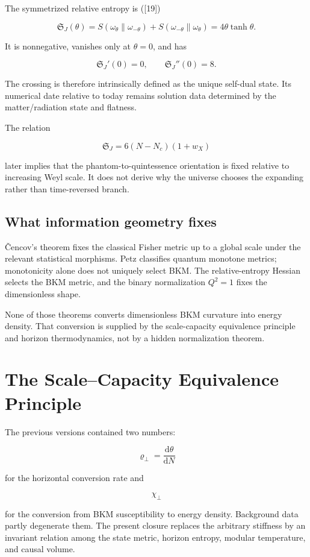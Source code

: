 \documentclass[
  11pt,
  letterpaper,
]{article}
\begin{document}
The symmetrized relative entropy is ({[}19{]})

\[
\boxed{
\mathfrak S_J(\theta)
=S(\omega_\theta\|\omega_{-\theta})
+S(\omega_{-\theta}\|\omega_\theta)
=4\theta\tanh\theta.
}
\]

It is nonnegative, vanishes only at \(\theta=0\), and has

\[
\mathfrak S_J'(0)=0,
\qquad
\mathfrak S_J''(0)=8.
\]

The crossing is therefore intrinsically defined as the unique self-dual
state. Its numerical date relative to today remains solution data
determined by the matter/radiation state and flatness.

The relation

\[
\mathfrak S_J=6(N-N_c)(1+w_X)
\]

later implies that the phantom-to-quintessence orientation is fixed
relative to increasing Weyl scale. It does not derive why the universe
chooses the expanding rather than time-reversed branch.

\subsection{What information geometry
fixes}\label{what-information-geometry-fixes}

Čencov's theorem fixes the classical Fisher metric up to a global scale
under the relevant statistical morphisms. Petz classifies quantum
monotone metrics; monotonicity alone does not uniquely select BKM. The
relative-entropy Hessian selects the BKM metric, and the binary
normalization \(Q^2=1\) fixes the dimensionless shape.

None of those theorems converts dimensionless BKM curvature into energy
density. That conversion is supplied by the scale-capacity equivalence
principle and horizon thermodynamics, not by a hidden normalization
theorem.

\section{The Scale--Capacity Equivalence
Principle}\label{the-scalecapacity-equivalence-principle}

The previous versions contained two numbers:

\[
\varrho_\perp=\frac{\mathrm d\theta}{\mathrm dN}
\]

for the horizontal conversion rate and

\[
\chi_\perp
\]

for the conversion from BKM susceptibility to energy density. Background
data partly degenerate them. The present closure replaces the arbitrary
stiffness by an invariant relation among the state metric, horizon
entropy, modular temperature, and causal volume.
\end{document}
